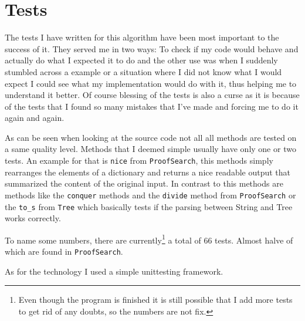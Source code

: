 \section{Tests}
The tests I have written for this algorithm have been most important to the success of it. They served me in two ways: To check if my code would behave and actually do what I expected it to do and the other use was when I suddenly stumbled across a example or a situation where I did not know what I would expect I could see what my implementation would do with it, thus helping me to understand it better.
Of course blessing of the tests is also a curse as it is because of the tests that I found so many mistakes that I've made and forcing me to do it again and again.

As can be seen when looking at the source code not all all methods are tested on a same quality level. Methods that I deemed simple usually have only one or two tests. An example for that is \texttt{nice} from \texttt{ProofSearch}, this methods simply rearranges the elements of a dictionary and returns a nice readable output that summarized the content of the original input. In contrast to this methods are methods like the \texttt{conquer} methods and the \texttt{divide} method from \texttt{ProofSearch} or the \texttt{to\_s} from \texttt{Tree} which basically tests if the parsing between String and Tree works correctly.

To name some numbers, there are currently\footnote{Even though the program is finished it is still possible that I add more tests to get rid of any doubts, so the numbers are not fix.} a total of 66 tests. Almost halve of which are found in \texttt{ProofSearch}. 

As for the technology I used a simple unittesting framework.
